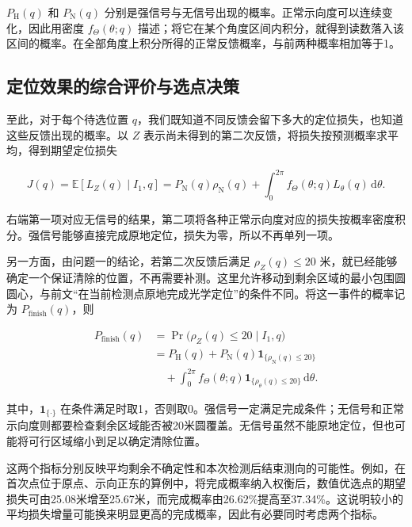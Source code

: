 \(P_{\mathrm H}(q)\) 和 \(P_{\mathrm N}(q)\) 分别是强信号与无信号出现的概率。正常示向度可以连续变化，因此用密度 \(f_\Theta(\theta;q)\) 描述；将它在某个角度区间内积分，就得到读数落入该区间的概率。在全部角度上积分所得的正常反馈概率，与前两种概率相加等于1。

\subsection{定位效果的综合评价与选点决策}

至此，对于每个待选位置 \(q\)，我们既知道不同反馈会留下多大的定位损失，也知道这些反馈出现的概率。以 \(Z\) 表示尚未得到的第二次反馈，将损失按预测概率求平均，得到期望定位损失

\begin{equation}
 J(q)=\mathbb E[L_Z(q)\mid I_1,q]
 =P_{\mathrm N}(q)\rho_{\mathrm N}(q)
 +\int_0^{2\pi}f_\Theta(\theta;q)L_\theta(q)\,\mathrm d\theta.
\label{eq:q2-pair-expected-objective}
\end{equation}

右端第一项对应无信号的结果，第二项将各种正常示向度对应的损失按概率密度积分。强信号能够直接完成原地定位，损失为零，所以不再单列一项。

另一方面，由问题一的结论，若第二次反馈后满足 \(\rho_Z(q)\le20\) 米，就已经能够确定一个保证清除的位置，不再需要补测。这里允许移动到剩余区域的最小包围圆圆心，与前文“在当前检测点原地完成光学定位”的条件不同。将这一事件的概率记为 \(P_{\mathrm{finish}}(q)\)，则

\begin{equation}
\begin{aligned}
 P_{\mathrm{finish}}(q)
 &=\Pr\bigl(\rho_Z(q)\le20\mid I_1,q\bigr)\\
 &=P_{\mathrm H}(q)+P_{\mathrm N}(q)\mathbf1_{\{\rho_{\mathrm N}(q)\le20\}}\\
 &\quad+\int_0^{2\pi}f_\Theta(\theta;q)\mathbf1_{\{\rho_\theta(q)\le20\}}\,\mathrm d\theta.
\end{aligned}
\label{eq:q2-completion-probability}
\end{equation}

其中，\(\mathbf1_{\{\cdot\}}\) 在条件满足时取1，否则取0。强信号一定满足完成条件；无信号和正常示向度则都要检查剩余区域能否被20米圆覆盖。无信号虽然不能原地定位，但也可能将可行区域缩小到足以确定清除位置。

这两个指标分别反映平均剩余不确定性和本次检测后结束测向的可能性。例如，在首次点位于原点、示向正东的算例中，将完成概率纳入权衡后，数值优选点的期望损失可由25.08米增至25.67米，而完成概率由26.62\%提高至37.34\%。这说明较小的平均损失增量可能换来明显更高的完成概率，因此有必要同时考虑两个指标。

